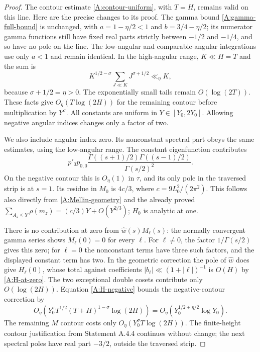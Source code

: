 \begin{proof}
The contour estimate \eqref{A:contour-uniform}, with $T=H$,
remains valid on this line. Here are the precise changes to its
proof. The gamma bound \eqref{A:gamma-full-bound} is unchanged,
with $a=1-\eta/2<1$ and $b=3/4-\eta/2$; its numerator gamma
functions still have fixed real parts strictly between $-1/2$
and $-1/4$, and so have no pole on the line. The low-angular and
comparable-angular integrations use only $a<1$ and remain
identical. In the high-angular range, $K\ll H=T$ and the sum is
\[
 K^{1/2-\sigma}\sum_{J\ll K}J^{\sigma+1/2}
       \ll_\eta K,
\]
because $\sigma+1/2=\eta>0$. The exponentially small tails
remain $O(\log(2T))$. These facts give
$O_\eta(T\log(2H))$ for the remaining contour before multiplication
by $Y^\sigma$. All constants are uniform in $Y\in[Y_0,2Y_0]$.
Allowing negative angular indices changes only a factor of two.

We also include angular index zero. Its nonconstant spectral
part obeys the same estimates, using the low-angular range.
The constant eigenfunction contributes
\[
 p'_0p_{0,0}
 \frac{\Gamma((s+1)/2)\Gamma((s-1)/2)}{\Gamma(s/2)^2}.
\]
On the negative contour this is $O_\eta(1)$ in $\tau$, and
its only pole in the traversed strip is at $s=1$.
Its residue in $M_0$ is $4c/3$, where
$c=9L_0^2/(2\pi^2)$. This follows also directly from
\eqref{A:Mellin-geometry} and the already proved
$\sum_{A_z\leq Y}\rho(m_z)=(c/3)Y+O(Y^{2/3})$;
$H_0$ is analytic at one.

There is no contribution at zero from $\widehat w(s)M_\ell(s)$:
the normally convergent gamma series shows $M_\ell(0)=0$
for every $\ell$. For $\ell\ne0$, the factor $1/\Gamma(s/2)$
gives this zero; for $\ell=0$ the nonconstant terms have three
such factors, and the displayed constant term has two.
In the geometric correction the pole of $\widehat w$ does give
$H_\ell(0)$, whose total against coefficients
$|b_\ell|\ll(1+|\ell|)^{-1}$ is $O(H)$ by
\eqref{A:H-at-zero}. The two exceptional double cosets contribute
only $O(\log(2H))$.
Equation \eqref{A:H-negative} bounds the negative-contour
correction by
\[
 O_\eta\left(Y_0^\sigma
       T^{1/2}(T+H)^{1-\sigma}\log(2H)\right)
 =O_\eta\left(Y_0^{1/2+\eta/2}\log Y_0\right).
\]
The remaining $M$ contour costs only
$O_\eta(Y_0^\sigma T\log(2H))$.
The finite-height contour justification from Statement A.4.4
continues without change; the next spectral poles have real part
$-3/2$, outside the traversed strip.


\end{proof}
